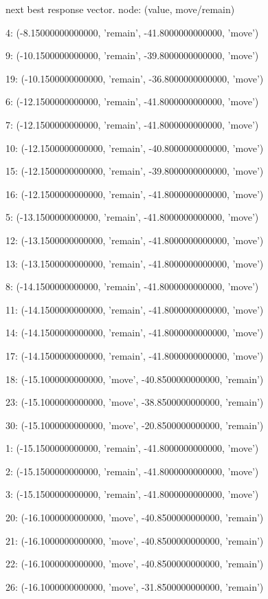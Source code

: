  next best response vector.  node: (value, move/remain)


4: (-8.15000000000000, 'remain', -41.8000000000000, 'move')


9: (-10.1500000000000, 'remain', -39.8000000000000, 'move')


19: (-10.1500000000000, 'remain', -36.8000000000000, 'move')


6: (-12.1500000000000, 'remain', -41.8000000000000, 'move')


7: (-12.1500000000000, 'remain', -41.8000000000000, 'move')


10: (-12.1500000000000, 'remain', -40.8000000000000, 'move')


15: (-12.1500000000000, 'remain', -39.8000000000000, 'move')


16: (-12.1500000000000, 'remain', -41.8000000000000, 'move')


5: (-13.1500000000000, 'remain', -41.8000000000000, 'move')


12: (-13.1500000000000, 'remain', -41.8000000000000, 'move')


13: (-13.1500000000000, 'remain', -41.8000000000000, 'move')


8: (-14.1500000000000, 'remain', -41.8000000000000, 'move')


11: (-14.1500000000000, 'remain', -41.8000000000000, 'move')


14: (-14.1500000000000, 'remain', -41.8000000000000, 'move')


17: (-14.1500000000000, 'remain', -41.8000000000000, 'move')


18: (-15.1000000000000, 'move', -40.8500000000000, 'remain')


23: (-15.1000000000000, 'move', -38.8500000000000, 'remain')


30: (-15.1000000000000, 'move', -20.8500000000000, 'remain')


1: (-15.1500000000000, 'remain', -41.8000000000000, 'move')


2: (-15.1500000000000, 'remain', -41.8000000000000, 'move')


3: (-15.1500000000000, 'remain', -41.8000000000000, 'move')


20: (-16.1000000000000, 'move', -40.8500000000000, 'remain')


21: (-16.1000000000000, 'move', -40.8500000000000, 'remain')


22: (-16.1000000000000, 'move', -40.8500000000000, 'remain')


26: (-16.1000000000000, 'move', -31.8500000000000, 'remain')


